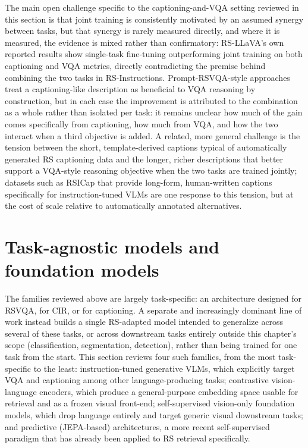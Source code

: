 The main open challenge specific to the captioning-and-VQA setting reviewed in this section is that joint training is consistently motivated by an assumed synergy between tasks, but that synergy is rarely measured directly, and where it is measured, the evidence is mixed rather than confirmatory: RS-LLaVA's own reported results show single-task fine-tuning outperforming joint training on both captioning and VQA metrics, directly contradicting the premise behind combining the two tasks in RS-Instructions. Prompt-RSVQA-style approaches treat a captioning-like description as beneficial to VQA reasoning by construction, but in each case the improvement is attributed to the combination as a whole rather than isolated per task: it remains unclear how much of the gain comes specifically from captioning, how much from VQA, and how the two interact when a third objective is added. A related, more general challenge is the tension between the short, template-derived captions typical of automatically generated RS captioning data and the longer, richer descriptions that better support a VQA-style reasoning objective when the two tasks are trained jointly; datasets such as RSICap that provide long-form, human-written captions specifically for instruction-tuned VLMs are one response to this tension, but at the cost of scale relative to automatically annotated alternatives.
\section{Task-agnostic models and foundation models}
\label{sec:rw-foundation}

The families reviewed above are largely task-specific: an architecture designed for RSVQA, for CIR, or for captioning. A separate and increasingly dominant line of work instead builds a single RS-adapted model intended to generalize across several of these tasks, or across downstream tasks entirely outside this chapter's scope (classification, segmentation, detection), rather than being trained for one task from the start. This section reviews four such families, from the most task-specific to the least: instruction-tuned generative VLMs, which explicitly target VQA and captioning among other language-producing tasks; contrastive vision-language encoders, which produce a general-purpose embedding space usable for retrieval and as a frozen visual front-end; self-supervised vision-only foundation models, which drop language entirely and target generic visual downstream tasks; and predictive (JEPA-based) architectures, a more recent self-supervised paradigm that has already been applied to RS retrieval specifically.

